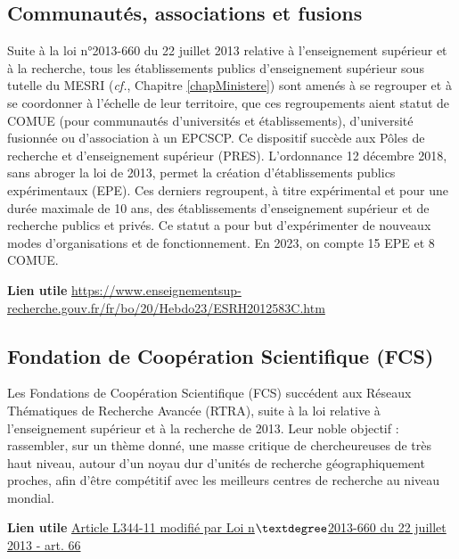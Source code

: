 \subsection{Communaut\'es, associations et fusions}
Suite \`a la loi n°2013-660 du 22 juillet 2013 relative \`a  l'enseignement sup\'erieur et \`a la recherche,
tous les \'etablissements publics d'enseignement sup\'erieur sous tutelle du MESRI ({\em cf.}, Chapitre \ref{chapMinistere}) sont amen\'es \`a  se regrouper et \`a se coordonner \`a l'\'echelle de leur territoire, que ces regroupements aient statut de COMUE (pour communaut\'es d'universit\'es et \'etablissements), d'universit\'e fusionn\'ee ou d'association \`a  un EPCSCP.
Ce dispositif succ\`ede aux P\^oles de recherche et d'enseignement sup\'erieur (PRES). L'ordonnance 12 d\'ecembre 2018, sans abroger la loi de 2013, permet la cr\'eation d'\'etablissements publics exp\'erimentaux (EPE). Ces derniers regroupent, \`a titre exp\'erimental et pour une dur\'ee maximale de 10 ans, des \'etablissements d'enseignement sup\'erieur et de recherche publics et priv\'es. Ce statut a pour but d'exp\'erimenter de nouveaux modes d'organisations et de fonctionnement. En 2023, on compte 15 EPE et 8 COMUE.

\textbf{Lien utile\hspace{.5em}}
\url{https://www.enseignementsup-recherche.gouv.fr/fr/bo/20/Hebdo23/ESRH2012583C.htm}

\subsection{Fondation de Coop\'eration Scientifique (FCS)}

Les Fondations de Coop\'eration Scientifique (FCS) succ\'edent aux R\'eseaux Th\'ematiques de Recherche Avanc\'ee (RTRA), suite à la loi relative \`a l'enseignement sup\'erieur et \`a la recherche de 2013.
Leur noble objectif : rassembler, sur un th\`eme donn\'e, une masse critique de chercheur\mp euse\mp s de tr\`es haut niveau, autour d'un noyau dur d'unit\'es de recherche g\'eographiquement proches, afin d'\^etre comp\'etitif avec les meilleurs centres de recherche au niveau mondial.

\textbf{Lien utile\hspace{.5em}}
\href{hhttps://www.legifrance.gouv.fr/codes/id/LEGISCTA000027748290}{Article L344-11 modifi\'e par Loi n$\textdegree$2013-660 du 22 juillet 2013 - art. 66}

